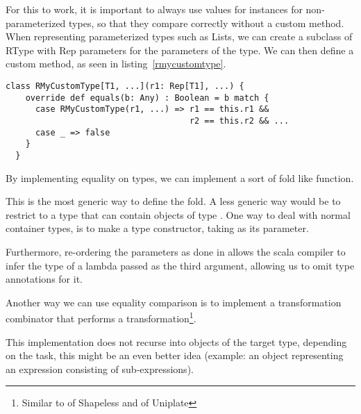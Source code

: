 For this to work, it is important to always use values for  instances
for non-parameterized types, so that they compare correctly without a custom
 method.
When representing parameterized types such as Lists, we can create a subclass
of RType with Rep parameters for the parameters of the type. We can then
define a custom  method, as seen in listing~\ref{rmycustomtype}.

\begin{lstlisting}[float,caption=Pattern for representing parameterized types,label=rmycustomtype]
  class RMyCustomType[T1, ...](r1: Rep[T1], ...) {
    override def equals(b: Any) : Boolean = b match {
      case RMyCustomType(r1, ...) => r1 == this.r1 &&
                                     r2 == this.r2 && ...
      case _ => false
    }
  }
\end{lstlisting}


\begin{example}
  By implementing equality on types, we can implement a sort of fold like
  function.

  

  This is the most generic way to define the fold. A less generic way would be
  to restrict  to a type that can contain objects of type . One way
  to deal with normal container types, is to make  a type constructor,
  taking  as its parameter.

  

  Furthermore, re-ordering the parameters as done in  allows the
  scala compiler to infer the type of a lambda passed as the third argument,
  allowing us to omit type annotations for it.
\end{example}

\begin{example}
  Another way we can use equality comparison is to implement a transformation
  combinator that performs a transformation\footnote{Similar to 
  of Shapeless and  of Uniplate}.

  

  This implementation does not recurse into objects of the target type, depending
  on the task, this might be an even better idea (example: an object representing
  an expression consisting of sub-expressions).
\end{example}

